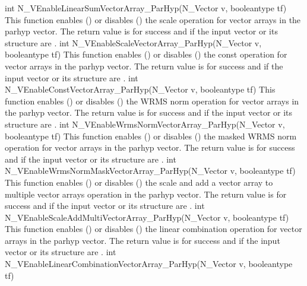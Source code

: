 {
  int N\_VEnableLinearSumVectorArray\_ParHyp(N\_Vector v, booleantype tf)
}
{
  This function enables () or disables () the scale
  operation for vector arrays in the parhyp vector. The return value is  for
  success and  if the input vector or its  structure are .
}
{
  int N\_VEnableScaleVectorArray\_ParHyp(N\_Vector v, booleantype tf)
}
{
  This function enables () or disables () the const
  operation for vector arrays in the parhyp vector. The return value is  for
  success and  if the input vector or its  structure are .
}
{
  int N\_VEnableConstVectorArray\_ParHyp(N\_Vector v, booleantype tf)
}
{
  This function enables () or disables () the WRMS norm
  operation for vector arrays in the parhyp vector. The return value is  for
  success and  if the input vector or its  structure are .
}
{
  int N\_VEnableWrmsNormVectorArray\_ParHyp(N\_Vector v, booleantype tf)
}
{
  This function enables () or disables () the masked WRMS
  norm operation for vector arrays in the parhyp vector. The return value is
   for success and  if the input vector or its  structure are
  .
}
{
  int N\_VEnableWrmsNormMaskVectorArray\_ParHyp(N\_Vector v, booleantype tf)
}
{
  This function enables () or disables () the scale and
  add a vector array to multiple vector arrays operation in the parhyp vector. The
  return value is  for success and  if the input vector or its
   structure are .
}
{
  int N\_VEnableScaleAddMultiVectorArray\_ParHyp(N\_Vector v,
  booleantype tf)
}
{
  This function enables () or disables () the linear
  combination operation for vector arrays in the parhyp vector. The return value
  is  for success and  if the input vector or its  structure
  are .
}
{
  int N\_VEnableLinearCombinationVectorArray\_ParHyp(N\_Vector v,
  booleantype tf)
}
